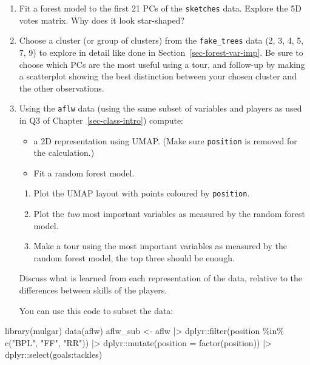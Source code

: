 \documentclass[
  letterpaper,
]{krantz}
\newenvironment{Shaded}{\begin{snugshade}}{\end{snugshade}}
\newcommand{\AttributeTok}[1]{\textcolor[rgb]{0.40,0.45,0.13}{#1}}
\newcommand{\FunctionTok}[1]{\textcolor[rgb]{0.28,0.35,0.67}{#1}}
\newcommand{\NormalTok}[1]{\textcolor[rgb]{0.00,0.23,0.31}{#1}}
\newcommand{\OtherTok}[1]{\textcolor[rgb]{0.00,0.23,0.31}{#1}}
\newcommand{\SpecialCharTok}[1]{\textcolor[rgb]{0.37,0.37,0.37}{#1}}
\newcommand{\StringTok}[1]{\textcolor[rgb]{0.13,0.47,0.30}{#1}}
\providecommand{\tightlist}{%
  \setlength{\itemsep}{0pt}\setlength{\parskip}{0pt}}
\begin{document}
\begin{enumerate}
\def\labelenumi{\arabic{enumi}.}
\setcounter{enumi}{3}
\item
  Fit a forest model to the first 21 PCs of the \texttt{sketches} data.
  Explore the 5D votes matrix. Why does it look star-shaped?
\item
  Choose a cluster (or group of clusters) from the \texttt{fake\_trees}
  data (2, 3, 4, 5, 7, 9) to explore in detail like done in
  Section~\ref{sec-forest-var-imp}. Be sure to choose which PCs are the
  most useful using a tour, and follow-up by making a scatterplot
  showing the best distinction between your chosen cluster and the other
  observations.
\item
  Using the \texttt{aflw} data (using the same subset of variables and
  players as used in Q3 of Chapter~\ref{sec-class-intro}) compute:

  \begin{itemize}
  \tightlist
  \item
    a 2D representation using UMAP. (Make sure \texttt{position} is
    removed for the calculation.)
  \item
    Fit a random forest model.
  \end{itemize}

  \begin{enumerate}
  \def\labelenumii{\alph{enumii}.}
  \tightlist
  \item
    Plot the UMAP layout with points coloured by \texttt{position}.
  \item
    Plot the \emph{two} most important variables as measured by the
    random forest model.
  \item
    Make a tour using the most important variables as measured by the
    random forest model, the top three should be enough.
  \end{enumerate}

  Discuss what is learned from each representation of the data, relative
  to the differences between skills of the players.

  You can use this code to subset the data:
\end{enumerate}

\begin{Shaded}
\begin{Highlighting}[]
\FunctionTok{library}\NormalTok{(mulgar)}
\FunctionTok{data}\NormalTok{(aflw)}
\NormalTok{aflw\_sub }\OtherTok{\textless{}{-}}\NormalTok{ aflw }\SpecialCharTok{|\textgreater{}} 
\NormalTok{  dplyr}\SpecialCharTok{::}\FunctionTok{filter}\NormalTok{(position }\SpecialCharTok{\%in\%} \FunctionTok{c}\NormalTok{(}\StringTok{"BPL"}\NormalTok{, }\StringTok{"FF"}\NormalTok{, }\StringTok{"RR"}\NormalTok{)) }\SpecialCharTok{|\textgreater{}}
\NormalTok{  dplyr}\SpecialCharTok{::}\FunctionTok{mutate}\NormalTok{(}\AttributeTok{position =} \FunctionTok{factor}\NormalTok{(position)) }\SpecialCharTok{|\textgreater{}}
\NormalTok{  dplyr}\SpecialCharTok{::}\FunctionTok{select}\NormalTok{(goals}\SpecialCharTok{:}\NormalTok{tackles)}
\end{Highlighting}
\end{Shaded}
\end{document}
